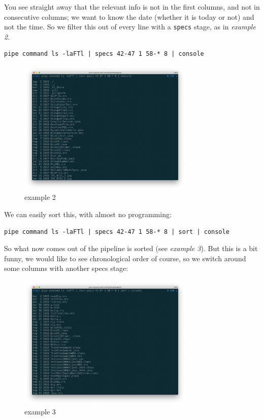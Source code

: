 You see straight away that the relevant info is not in the first
columns, and not in consecutive columns; we want to know the date
(whether it is today or not) and not the time. So we filter this out
of every line with a \texttt{specs} stage, as in \emph{example 2}.
\begin{lstlisting}
pipe command ls -laFTl | specs 42-47 1 58-* 8 | console
\end{lstlisting}
\begin{figure}[h]
  \includegraphics[width=0.75\textwidth]{images/example2.png}
  \caption{example 2}
  \label{fig:example2}
\end{figure}
We can easily sort this, with almost no programming:
\begin{lstlisting}
pipe command ls -laFTl | specs 42-47 1 58-* 8 | sort | console
\end{lstlisting}
So what now comes out of the pipeline is sorted (see \emph{example 3}).
But this is a bit funny, we would like to see chronological order of course, so we switch around some columns with another specs stage:
\begin{figure}[h]
  \includegraphics[width=0.75\textwidth]{images/example3.png}
  \caption{example 3}
  \label{fig:example3}
\end{figure}
